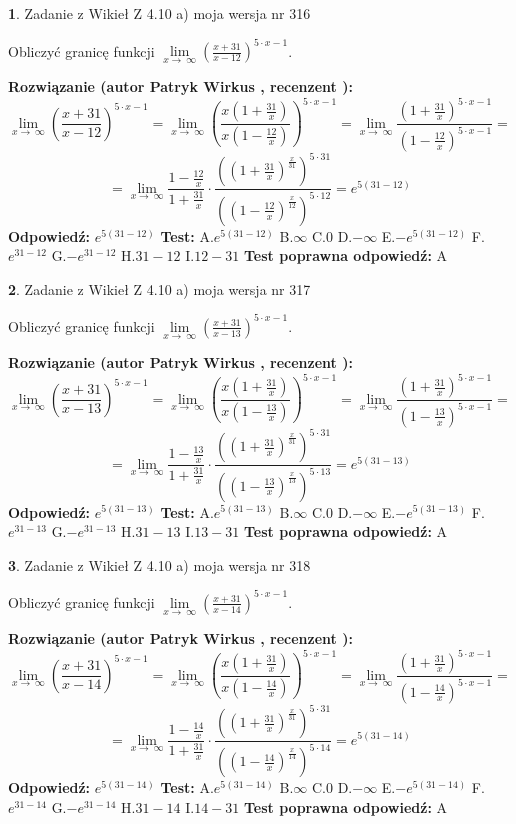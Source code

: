 \documentclass[12pt, a4paper]{article}
\theoremstyle{definition} %
\newtheorem{zad}{}
\newcommand{\zadStart}[1]{\begin{zad}#1\newline}
\newcommand{\zadStop}{\end{zad}}
\newcommand{\rozwStart}[2]{\noindent \textbf{Rozwiązanie (autor #1 , recenzent #2): }\newline}
\newcommand{\rozwStop}{\newline}
\newcommand{\odpStart}{\noindent \textbf{Odpowiedź:}\newline}
\newcommand{\odpStop}{\newline}
\newcommand{\testStart}{\noindent \textbf{Test:}\newline}
\newcommand{\testStop}{\newline}
\newcommand{\kluczStart}{\noindent \textbf{Test poprawna odpowiedź:}\newline}
\newcommand{\kluczStop}{\newline}
\begin{document}
\zadStart{Zadanie z Wikieł Z 4.10 a) moja wersja nr 316}


Obliczyć granicę funkcji  $\lim\limits_{x\to\ \infty}(\frac{x+31}{x-12})^{5\cdot x-1}$.
\zadStop
\rozwStart{Patryk Wirkus}{}
$$\lim\limits_{x\to\ \infty}(\frac{x+31}{x-12})^{5\cdot x-1} = \lim\limits_{x\to\ \infty}(\frac{x(1+\frac{31}{x})}{x(1-\frac{12}{x})})^{5\cdot x-1}=\lim\limits_{x\to\ \infty}\frac{(1+\frac{31}{x})^{5\cdot x-1}}{(1-\frac{12}{x})^{5\cdot x-1}}=$$
$$=\lim\limits_{x\to\ \infty}\frac{1-\frac{12}{x}}{1+\frac{31}{x}}\cdot\frac{((1+\frac{31}{x})^{\frac{x}{31}})^{5\cdot31}}{((1-\frac{12}{x})^{\frac{x}{12}})^{5\cdot12}}=e^{5(31-12)}$$
\rozwStop
\odpStart
$e^{5(31-12)}$
\odpStop
\testStart
A.$e^{5(31-12)}$ B.$\infty$ C.$0$ D.$-\infty$ E.$-e^{5(31-12)}$
F.$e^{31-12}$ G.$-e^{31-12}$
H.$31-12$
I.$12-31$
\testStop
\kluczStart
A
\kluczStop



\zadStart{Zadanie z Wikieł Z 4.10 a) moja wersja nr 317}


Obliczyć granicę funkcji  $\lim\limits_{x\to\ \infty}(\frac{x+31}{x-13})^{5\cdot x-1}$.
\zadStop
\rozwStart{Patryk Wirkus}{}
$$\lim\limits_{x\to\ \infty}(\frac{x+31}{x-13})^{5\cdot x-1} = \lim\limits_{x\to\ \infty}(\frac{x(1+\frac{31}{x})}{x(1-\frac{13}{x})})^{5\cdot x-1}=\lim\limits_{x\to\ \infty}\frac{(1+\frac{31}{x})^{5\cdot x-1}}{(1-\frac{13}{x})^{5\cdot x-1}}=$$
$$=\lim\limits_{x\to\ \infty}\frac{1-\frac{13}{x}}{1+\frac{31}{x}}\cdot\frac{((1+\frac{31}{x})^{\frac{x}{31}})^{5\cdot31}}{((1-\frac{13}{x})^{\frac{x}{13}})^{5\cdot13}}=e^{5(31-13)}$$
\rozwStop
\odpStart
$e^{5(31-13)}$
\odpStop
\testStart
A.$e^{5(31-13)}$ B.$\infty$ C.$0$ D.$-\infty$ E.$-e^{5(31-13)}$
F.$e^{31-13}$ G.$-e^{31-13}$
H.$31-13$
I.$13-31$
\testStop
\kluczStart
A
\kluczStop



\zadStart{Zadanie z Wikieł Z 4.10 a) moja wersja nr 318}


Obliczyć granicę funkcji  $\lim\limits_{x\to\ \infty}(\frac{x+31}{x-14})^{5\cdot x-1}$.
\zadStop
\rozwStart{Patryk Wirkus}{}
$$\lim\limits_{x\to\ \infty}(\frac{x+31}{x-14})^{5\cdot x-1} = \lim\limits_{x\to\ \infty}(\frac{x(1+\frac{31}{x})}{x(1-\frac{14}{x})})^{5\cdot x-1}=\lim\limits_{x\to\ \infty}\frac{(1+\frac{31}{x})^{5\cdot x-1}}{(1-\frac{14}{x})^{5\cdot x-1}}=$$
$$=\lim\limits_{x\to\ \infty}\frac{1-\frac{14}{x}}{1+\frac{31}{x}}\cdot\frac{((1+\frac{31}{x})^{\frac{x}{31}})^{5\cdot31}}{((1-\frac{14}{x})^{\frac{x}{14}})^{5\cdot14}}=e^{5(31-14)}$$
\rozwStop
\odpStart
$e^{5(31-14)}$
\odpStop
\testStart
A.$e^{5(31-14)}$ B.$\infty$ C.$0$ D.$-\infty$ E.$-e^{5(31-14)}$
F.$e^{31-14}$ G.$-e^{31-14}$
H.$31-14$
I.$14-31$
\testStop
\kluczStart
A
\kluczStop
\end{document}

